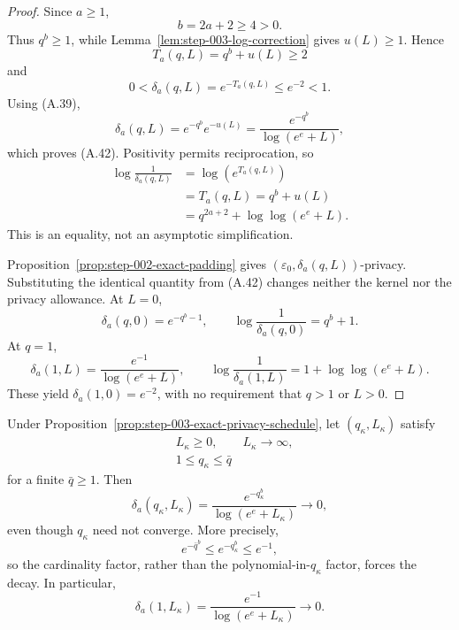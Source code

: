 \begin{proof}
Since \(a\geq1\),
\[
b=2a+2\geq4>0.
\tag{A.44}
\]
Thus \(q^b\geq1\), while
Lemma~\ref{lem:step-003-log-correction} gives \(u(L)\geq1\).  Hence
\[
T_a(q,L)=q^b+u(L)\geq2
\tag{A.45}
\]
and
\[
0<\delta_a(q,L)=e^{-T_a(q,L)}\leq e^{-2}<1.
\tag{A.46}
\]
Using (A.39),
\[
\delta_a(q,L)
=e^{-q^b}e^{-u(L)}
=\frac{e^{-q^b}}{\log(e^e+L)},
\tag{A.47}
\]
which proves (A.42).  Positivity permits reciprocation, so
\[
\begin{aligned}
\log\frac1{\delta_a(q,L)}
&=\log(e^{T_a(q,L)})\\
&=T_a(q,L)
=q^b+u(L)\\
&=q^{2a+2}+\log\log(e^e+L).
\end{aligned}
\tag{A.48}
\]
This is an equality, not an asymptotic simplification.

Proposition~\ref{prop:step-002-exact-padding} gives
\((\varepsilon_0,\delta_a(q,L))\)-privacy.  Substituting the identical
quantity from (A.42) changes neither the kernel nor the privacy
allowance.  At \(L=0\),
\[
\delta_a(q,0)=e^{-q^b-1},\qquad
\log\frac1{\delta_a(q,0)}=q^b+1.
\tag{A.49}
\]
At \(q=1\),
\[
\delta_a(1,L)=\frac{e^{-1}}{\log(e^e+L)},\qquad
\log\frac1{\delta_a(1,L)}
=1+\log\log(e^e+L).
\tag{A.50}
\]
These yield \(\delta_a(1,0)=e^{-2}\), with no requirement that
\(q>1\) or \(L>0\).
\end{proof}

\begin{proposition}
\label{prop:step-003-bounded-q-activation}
Under Proposition~\ref{prop:step-003-exact-privacy-schedule}, let
\((q_\kappa,L_\kappa)\) satisfy
\[
\begin{aligned}
&L_\kappa\geq0,\qquad L_\kappa\to\infty,\\
&1\leq q_\kappa\leq\bar q
\end{aligned}
\tag{A.51}
\]
for a finite \(\bar q\geq1\).  Then
\[
\delta_a(q_\kappa,L_\kappa)
=\frac{e^{-q_\kappa^b}}{\log(e^e+L_\kappa)}
\longrightarrow0,
\tag{A.52}
\]
even though \(q_\kappa\) need not converge.  More precisely,
\[
e^{-\bar q^b}\leq e^{-q_\kappa^b}\leq e^{-1},
\tag{A.53}
\]
so the cardinality factor, rather than the polynomial-in-\(q_\kappa\)
factor, forces the decay.  In particular,
\[
\delta_a(1,L_\kappa)
=\frac{e^{-1}}{\log(e^e+L_\kappa)}
\longrightarrow0.
\tag{A.54}
\]
\end{proposition}

